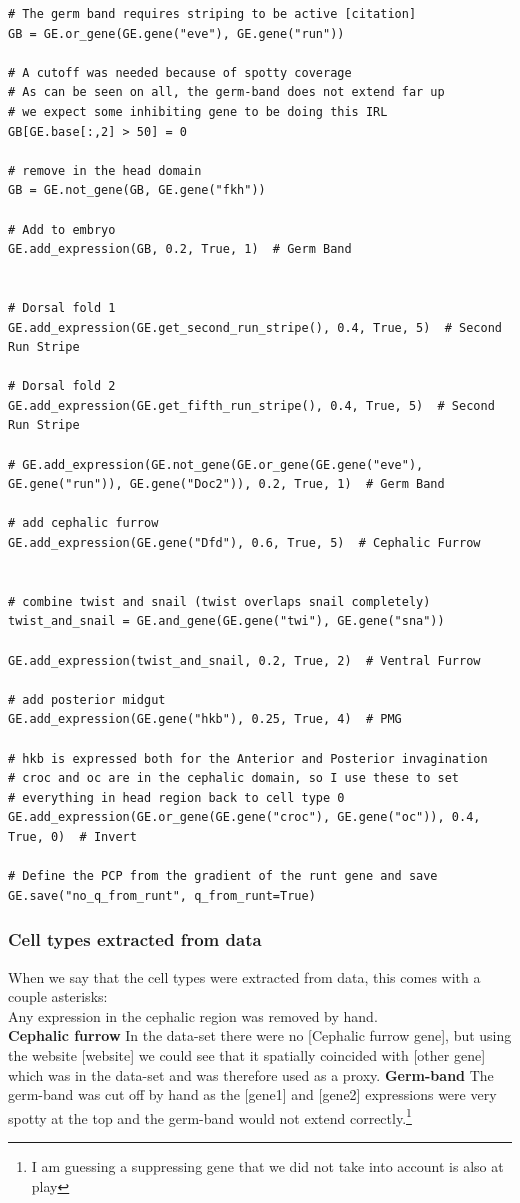 \begin{lstlisting}
# The germ band requires striping to be active [citation]
GB = GE.or_gene(GE.gene("eve"), GE.gene("run"))

# A cutoff was needed because of spotty coverage
# As can be seen on all, the germ-band does not extend far up
# we expect some inhibiting gene to be doing this IRL
GB[GE.base[:,2] > 50] = 0

# remove in the head domain
GB = GE.not_gene(GB, GE.gene("fkh"))

# Add to embryo
GE.add_expression(GB, 0.2, True, 1)  # Germ Band


# Dorsal fold 1
GE.add_expression(GE.get_second_run_stripe(), 0.4, True, 5)  # Second Run Stripe

# Dorsal fold 2
GE.add_expression(GE.get_fifth_run_stripe(), 0.4, True, 5)  # Second Run Stripe

# GE.add_expression(GE.not_gene(GE.or_gene(GE.gene("eve"), GE.gene("run")), GE.gene("Doc2")), 0.2, True, 1)  # Germ Band

# add cephalic furrow
GE.add_expression(GE.gene("Dfd"), 0.6, True, 5)  # Cephalic Furrow


# combine twist and snail (twist overlaps snail completely)
twist_and_snail = GE.and_gene(GE.gene("twi"), GE.gene("sna"))

GE.add_expression(twist_and_snail, 0.2, True, 2)  # Ventral Furrow

# add posterior midgut
GE.add_expression(GE.gene("hkb"), 0.25, True, 4)  # PMG

# hkb is expressed both for the Anterior and Posterior invagination
# croc and oc are in the cephalic domain, so I use these to set 
# everything in head region back to cell type 0
GE.add_expression(GE.or_gene(GE.gene("croc"), GE.gene("oc")), 0.4, True, 0)  # Invert

# Define the PCP from the gradient of the runt gene and save
GE.save("no_q_from_runt", q_from_runt=True)
\end{lstlisting}

\subsubsection{Cell types extracted from data}
When we say that the cell types were extracted from data, this comes with a couple asterisks:\\
Any expression in the cephalic region was removed by hand.\\
\textbf{Cephalic furrow}
In the data-set there were no [Cephalic furrow gene], but using the website [website] we could see that it spatially coincided with [other gene] which was in the data-set and was therefore used as a proxy. 
\textbf{Germ-band}
The germ-band was cut off by hand as the [gene1] and [gene2] expressions were very spotty at the top and the germ-band would not extend correctly.\footnote{I am guessing a suppressing gene that we did not take into account is also at play} 

